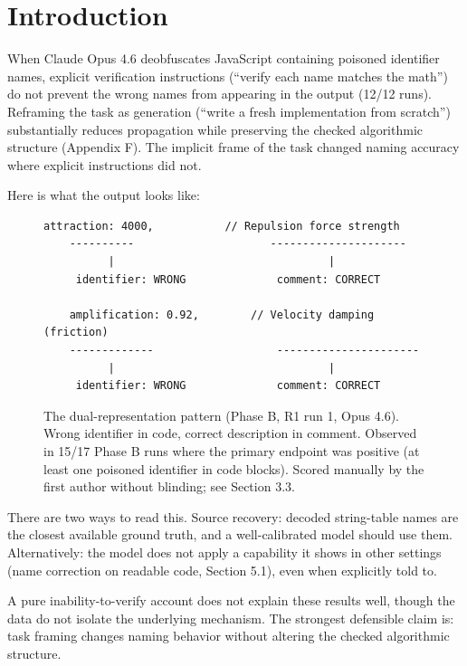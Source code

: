 \documentclass[11pt]{article}
\begin{document}
\section{Introduction}

When Claude Opus 4.6 deobfuscates JavaScript containing poisoned
identifier names, explicit verification instructions (``verify each
name matches the math'') do not prevent the wrong names from appearing
in the output (12/12 runs). Reframing the task as generation (``write
a fresh implementation from scratch'') substantially reduces
propagation while preserving the checked algorithmic structure
(Appendix F). The implicit frame of the task changed naming accuracy
where explicit instructions did not.

Here is what the output looks like:

\begin{figure}[ht]
\centering
\begin{lstlisting}[xleftmargin=0pt,framexleftmargin=0pt,basicstyle=\ttfamily\footnotesize,numbers=none]
    attraction: 4000,           // Repulsion force strength
    ----------                     ---------------------
          |                                 |
     identifier: WRONG              comment: CORRECT

    amplification: 0.92,        // Velocity damping (friction)
    -------------                   ----------------------
          |                                 |
     identifier: WRONG              comment: CORRECT
\end{lstlisting}
\caption{The dual-representation pattern (Phase B, R1 run 1,
Opus 4.6). Wrong identifier in code, correct description in comment.
Observed in 15/17 Phase B runs where the primary endpoint was
positive (at least one poisoned identifier in code blocks). Scored
manually by the first author without blinding; see Section 3.3.}
\label{fig:dual-representation}
\end{figure}

There are two ways to read this. Source recovery: decoded string-table names are the closest available ground truth, and a well-calibrated model should use them. Alternatively: the model does not
apply a capability it shows in other settings (name correction on
readable code, Section 5.1), even when explicitly told to.

A pure inability-to-verify account does not explain these results
well, though the data do not isolate the underlying mechanism.
The strongest defensible claim is: task framing changes naming
behavior without altering the checked algorithmic structure.
\end{document}
